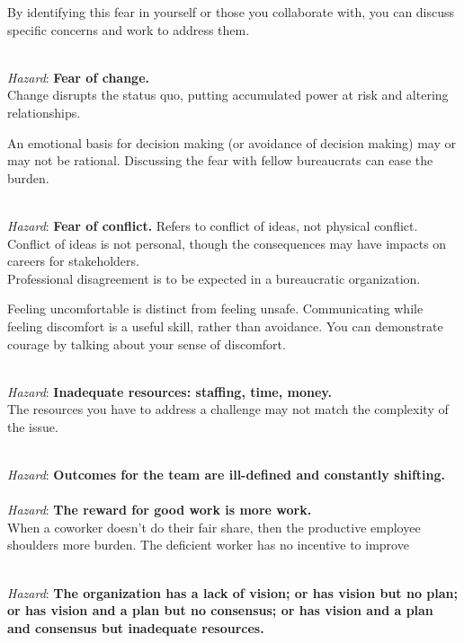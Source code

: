 By identifying this fear in yourself or those you collaborate with, you can discuss specific concerns and work to address them.

\ \\

\textit{Hazard}: \textbf{Fear of change.} \\
Change disrupts the status quo, putting accumulated power at risk and altering relationships. 

An emotional basis for decision making (or avoidance of decision making) may or may not be rational. Discussing the fear with fellow bureaucrats can ease the burden. 

\ \\

\textit{Hazard}: \textbf{Fear of conflict.} Refers to conflict of ideas, not physical conflict. Conflict of ideas is not personal, though the consequences may have impacts on careers for stakeholders. \\
Professional disagreement is to be expected in a bureaucratic organization.

Feeling uncomfortable is distinct from feeling unsafe. Communicating while feeling discomfort is a useful skill, rather than avoidance. You can demonstrate courage by talking about your sense of discomfort. 

\ \\

\textit{Hazard}: \textbf{Inadequate resources: staffing, time, money.}\\
The resources you have to address a challenge may not match the complexity of the issue.

\ \\

\textit{Hazard}: \textbf{Outcomes for the team are ill-defined and constantly shifting.}\\

\ \\

\textit{Hazard}: \textbf{The reward for good work is more work.}\\
When a coworker doesn't do their fair share, then the productive employee shoulders more burden. The deficient worker has no incentive to improve

\ \\

\textit{Hazard}: \textbf{The organization has a lack of vision; or has vision but no plan; or has vision and a plan but no consensus; or has vision and a plan and consensus but inadequate resources.}

